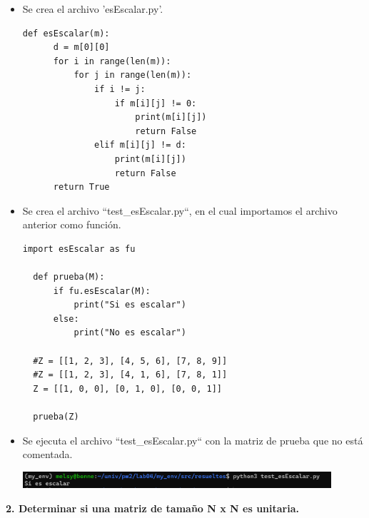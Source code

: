 \documentclass{article}
\begin{document}
  \vspace{\baselineskip}

  \begin{itemize}
  \item Se crea el archivo 'esEscalar.py'.
  
  \begin{lstlisting}[style=python]
  def esEscalar(m):
      d = m[0][0]
      for i in range(len(m)):
          for j in range(len(m)):
              if i != j:
                  if m[i][j] != 0:
                      print(m[i][j])
                      return False
              elif m[i][j] != d:
                  print(m[i][j])
                  return False
      return True
  \end{lstlisting}
  
  \item Se crea el archivo ``test\_esEscalar.py``, en el cual importamos el archivo anterior como función.
  
  \begin{lstlisting}[style=python]
  import esEscalar as fu

  def prueba(M):
      if fu.esEscalar(M):
          print("Si es escalar")
      else:
          print("No es escalar")

  #Z = [[1, 2, 3], [4, 5, 6], [7, 8, 9]]
  #Z = [[1, 2, 3], [4, 1, 6], [7, 8, 1]]
  Z = [[1, 0, 0], [0, 1, 0], [0, 0, 1]]

  prueba(Z)
  \end{lstlisting}

  \item Se ejecuta el archivo ``test\_esEscalar.py`` con la matriz de prueba que no está comentada.
  
  \begin{minipage}{\linewidth}
    \centering
    \includegraphics[width=0.9\textwidth]{imagenes/r_escalar.png}
  \end{minipage}

  \end{itemize}
    
  \pagebreak

\textbf{2. Determinar si una matriz de tamaño N x N es unitaria.}
  
  \vspace{\baselineskip}
\end{document}
